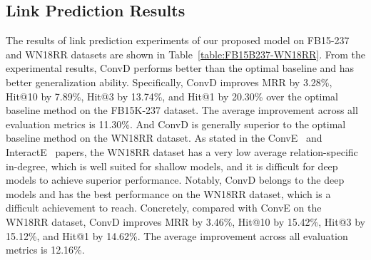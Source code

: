 \documentclass[letterpaper]{article} %
\begin{document}
\subsection{Link Prediction Results}
The results of link prediction experiments of our proposed model on FB15-237 and WN18RR datasets are shown in Table~\ref{table:FB15B237-WN18RR}. From the experimental results, ConvD performs better than the optimal baseline and has better generalization ability. Specifically, ConvD improves MRR by 3.28\%, Hit@10 by 7.89\%, Hit@3 by 13.74\%, and Hit@1 by 20.30\% over the optimal baseline method on the FB15K-237 dataset. The average improvement across all evaluation metrics is 11.30\%. And ConvD is generally superior to the optimal baseline method on the WN18RR dataset. As stated in the ConvE~\cite{ConvE} and InteractE~\cite{InteractE} papers, the WN18RR dataset has a very low average relation-specific in-degree, which is well suited for shallow models, and it is difficult for deep models to achieve superior performance. Notably, ConvD belongs to the deep models and has the best performance on the WN18RR dataset, which is a difficult achievement to reach. Concretely, compared with ConvE on the WN18RR dataset, ConvD improves MRR by 3.46\%, Hit@10 by 15.42\%, Hit@3 by 15.12\%, and Hit@1 by 14.62\%. The average improvement across all evaluation metrics is 12.16\%. 
\end{document}
